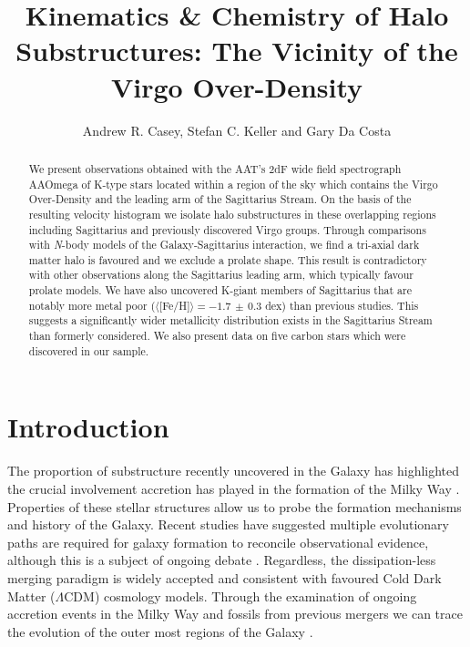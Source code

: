 \documentclass[preprint2]{aastex}
\begin{document}
\title{Kinematics \& Chemistry of Halo Substructures: The Vicinity of the Virgo Over-Density}

\author{Andrew R. Casey, Stefan C. Keller and Gary Da Costa}
		
	
\begin{abstract}
We present observations obtained with the AAT's 2dF wide field spectrograph AAOmega of K-type stars located within a region of the sky which contains the Virgo Over-Density and the leading arm of the Sagittarius Stream.  On the basis of the resulting velocity histogram we isolate halo substructures in these overlapping regions including Sagittarius and previously discovered Virgo groups. Through comparisons with \textit{N}-body models of the Galaxy-Sagittarius interaction, we find a tri-axial dark matter halo is favoured and we exclude a prolate shape. This result is contradictory with other observations along the Sagittarius leading arm, which typically favour prolate models.  We have also uncovered K-giant members of Sagittarius that are notably more metal poor ($\langle[$Fe/H$]\rangle = -1.7\,\pm\,0.3$ dex) than previous studies. This suggests a significantly wider metallicity distribution exists in the Sagittarius Stream than formerly considered. We also present data on five carbon stars which were discovered in our sample.
\end{abstract}



\section{Introduction}
\label{sec:introduction}

The proportion of substructure recently uncovered in the Galaxy has highlighted the crucial involvement accretion has played in the formation of the Milky Way \citep[see][and references therein]{Helmi_2008}. Properties of these stellar structures allow us to probe the formation mechanisms and history of the Galaxy. Recent studies \citep{Carollo;et-al_2007, Carollo;et-al_2010} have suggested multiple evolutionary paths are required for galaxy formation to reconcile observational evidence, although this is a subject of ongoing debate \citep{Schoenrich;et-al_2011}. Regardless, the dissipation-less merging paradigm is widely accepted and consistent with favoured Cold Dark Matter ($\Lambda$CDM) cosmology models. Through the examination of ongoing accretion events in the Milky Way and fossils from previous mergers we can trace the evolution of the outer most regions of the Galaxy \citep[e.g.,][]{Helmi;White_2001}.
	
\end{document}
